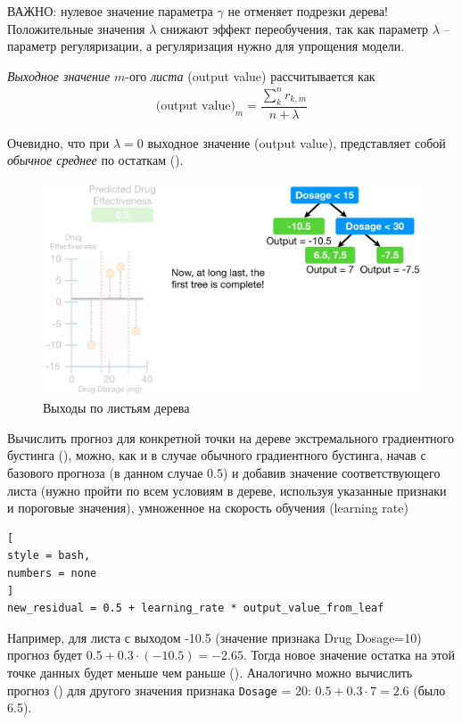 \documentclass[%
	11pt,
	a4paper,
	utf8,
		]{article}
\begin{document}
ВАЖНО: нулевое значение параметра $ \gamma $ не отменяет подрезки дерева! Положительные значения $ \lambda $ снижают эффект переобучения, так как параметр $ \lambda $ -- параметр регуляризации, а регуляризация нужно для упрощения модели.

\emph{Выходное значение} $ m $-ого \emph{листа} (output value) рассчитывается как
\begin{align*}
	\text{(output value)}_m = \dfrac{ \sum_{k}^{n} r_{k,m} }{n + \lambda}
\end{align*}

Очевидно, что при $ \lambda = 0 $ выходное значение (output value), представляет собой \emph{обычное среднее} по остаткам ().

\begin{figure}[h]
	\centering
	\includegraphics[scale=0.35]{figures/xgboost_output.png}
	\caption{ Выходы по листьям дерева }\label{fig:xgboost_output}
\end{figure}

Вычислить прогноз для конкретной точки на дереве экстремального градиентного бустинга (), можно, как и в случае обычного градиентного бустинга, начав с базового прогноза (в данном случае 0.5) и добавив значение соответствующего листа (нужно пройти по всем условиям в дереве, используя указанные признаки и пороговые значения), умноженное на скорость обучения (learning rate)
\begin{lstlisting}[
style = bash,
numbers = none	
]
new_residual = 0.5 + learning_rate * output_value_from_leaf
\end{lstlisting}

Например, для листа с выходом -10.5 (значение признака Drug Dosage=10) прогноз будет $ 0.5 + 0.3 \cdot (-10.5) = -2.65 $. Тогда новое значение остатка на этой точке данных будет меньше чем раньше (). Аналогично можно вычислить прогноз () для другого значения признака \texttt{Dosage} = 20: $ 0.5 + 0.3 \cdot 7 = 2.6 $ (было 6.5).
\end{document}
